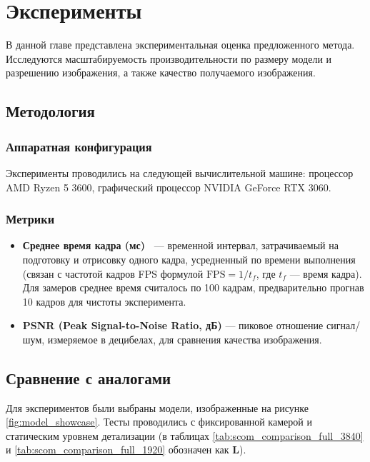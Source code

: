 \section{Эксперименты}
\label{sec:experiments}

В данной главе представлена экспериментальная оценка предложенного метода.
Исследуются масштабируемость производительности по размеру модели и разрешению изображения, а также качество получаемого изображения.

\subsection{Методология}
\label{sec:methodology}

\subsubsection{Аппаратная конфигурация}

Эксперименты проводились на следующей вычислительной машине: процессор AMD Ryzen 5 3600, графический процессор NVIDIA GeForce RTX 3060.

\subsubsection{Метрики}

\begin{itemize}
    \item \textbf{Среднее время кадра (мс)~\cite[с.~1]{RTR4}} --- временной интервал, затрачиваемый на подготовку и отрисовку одного кадра, усредненный по времени выполнения (связан с частотой кадров FPS формулой $\text{FPS} = 1/t_f$, где $t_f$ --- время кадра). Для замеров среднее время считалось по 100 кадрам, предварительно прогнав 10 кадров для чистоты эксперимента.
    \item \textbf{PSNR (Peak Signal-to-Noise Ratio, дБ)} --- пиковое отношение сигнал/шум, измеряемое в децибелах, для сравнения качества изображения.
\end{itemize}

\subsection{Сравнение с аналогами}
\label{sec:scalability_size}

Для экспериментов были выбраны модели, изображенные на рисунке \ref{fig:model_showcase}. Тесты проводились с фиксированной камерой и статическим уровнем детализации (в таблицах \ref{tab:scom_comparison_full_3840} и \ref{tab:scom_comparison_full_1920} обозначен как \textbf{L}).

